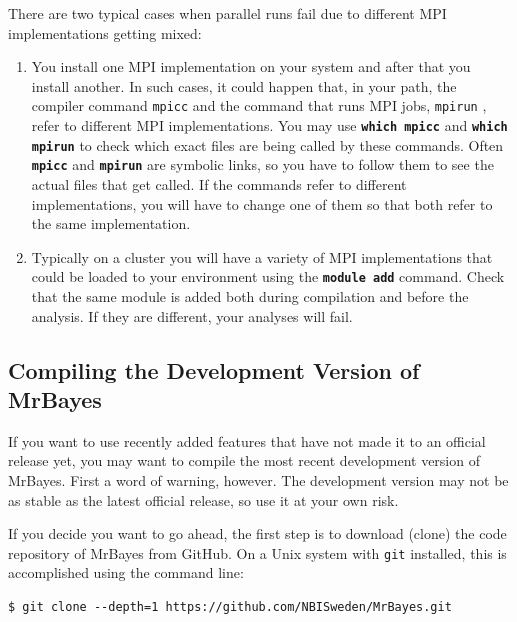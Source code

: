 \documentclass[12pt]{book}
\newcommand{\ttt}[1]{\texttt{#1} }
\newcommand{\tb}[1]{\ttt{\textbf{#1}} }
\begin{document}
There are two typical cases when parallel runs fail due to different MPI implementations getting
mixed:
 
\begin{enumerate}
\item You install one MPI implementation on your system and after that you install another. In 
such cases, it could happen that, in your path, the compiler command \ttt{mpicc} and the command
that runs MPI jobs, \ttt{mpirun}, refer to different MPI implementations. You may use
\tb{which mpicc} and \tb{which mpirun} to check which exact files are being called by these
commands. Often \tb{mpicc} and \tb{mpirun} are symbolic links, so you have to follow them to see
the actual files that get called. If the commands refer to different implementations, you will
have to change one of them so that both refer to the same implementation.
\item Typically on a cluster you will have a variety of MPI implementations that could be loaded
to your environment using the \tb{module add} command.  Check that the same module is added both
during compilation and before the analysis. If they are different, your analyses will fail.
\end{enumerate}

\subsection{Compiling the Development Version of MrBayes}
\label{compileDevVersion}
If you want to use recently added features that have not made it to an official release yet, you
may want to compile the most recent development version of MrBayes. First a word of warning,
however. The development version may not be as stable as the latest official release, so use it at
your own risk.

If you decide you want to go ahead, the first step is to download (clone) the code repository of
MrBayes from GitHub. On a Unix system with \ttt{git} installed, this is accomplished using the
command line:

\begin{verbatim}
$ git clone --depth=1 https://github.com/NBISweden/MrBayes.git
\end{verbatim}
\end{document}
